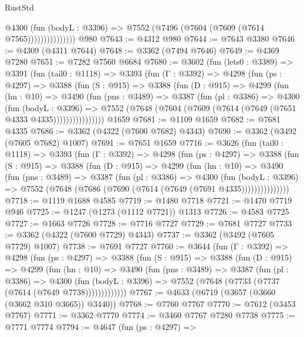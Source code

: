 \begin{lexlean}{RustStd}
\begin{coremodule}
                      @4300
                        (fun (bodyL : @3396) =>
                        @7552 (@7496 (@7604 (@7609 (@7614 @7565)))))))))))))))
    @980
@7643 := @4312 @980
@7644 := @7643 @3380
@7646 := @4309 (@4311 @7644)
@7648 := @3362 (@7494 @7646)
@7649 := @4369 @7280
@7651 := @7282 @7560 @6684
@7680 := @3602
    (fun (lets0 : @3389) =>
    @3391
      (fun (tail0 : @1118) =>
      @3393
        (fun (Γ : @3392) =>
        @4298
          (fun (ps : @4297) =>
          @3388
            (fun (S : @915) =>
            @3388
              (fun (D : @915) =>
              @4299
                (fun (hn : @10) =>
                @3490
                  (fun (pns : @3489) =>
                  @3387
                    (fun (pl : @3386) =>
                    @4300
                      (fun (bodyL : @3396) =>
                      @7552 (@7648 (@7604 (@7609 (@7614 (@7649 (@7651 @4333 @4335))))))))))))))))
    @1659
@7681 := @1109 @1659
@7682 := @7681 @4335
@7686 := @3362 (@4322 (@7600 @7682) @4343)
@7690 := @3362 (@3492 (@7605 @7682) @1007)
@7691 := @7651 @1659
@7716 := @3626
    (fun (tail0 : @1118) =>
    @3393
      (fun (Γ : @3392) =>
      @4298
        (fun (ps : @4297) =>
        @3388
          (fun (S : @915) =>
          @3388
            (fun (D : @915) =>
            @4299
              (fun (hn : @10) =>
              @3490
                (fun (pns : @3489) =>
                @3387
                  (fun (pl : @3386) =>
                  @4300
                    (fun (bodyL : @3396) =>
                    @7552 (@7648 (@7686 (@7690 (@7614 (@7649 (@7691 @4335)))))))))))))))
@7718 := @1119 @1688 @4585
@7719 := @1480 @7718
@7721 := @1470 @7719 @946
@7725 := @1247 (@1273 (@1112 @7721)) @1313
@7726 := @4583 @7725
@7727 := @1663 @7726
@7728 := @7716 @7727
@7729 := @7681 @7727
@7733 := @3362 (@4322 (@7600 @7729) @4343)
@7737 := @3362 (@3492 (@7605 @7729) @1007)
@7738 := @7691 @7727
@7760 := @3644
    (fun (Γ : @3392) =>
    @4298
      (fun (ps : @4297) =>
      @3388
        (fun (S : @915) =>
        @3388
          (fun (D : @915) =>
          @4299
            (fun (hn : @10) =>
            @3490
              (fun (pns : @3489) =>
              @3387
                (fun (pl : @3386) =>
                @4300
                  (fun (bodyL : @3396) =>
                  @7552 (@7648 (@7733 (@7737 (@7614 (@7649 @7738)))))))))))))
@7767 := @4633 (@6719 (@3657 (@3660 (@3662 @310 @3665)) @3440))
@7768 := @7760 @7767
@7770 := @7612 (@3453 @7767)
@7771 := @3362 @7770
@7774 := @3460 @7767 @7280 @7738
@7775 := @7771 @7774
@7794 := @4647
    (fun (ps : @4297) =>

\end{coremodule}
\end{lexlean}
